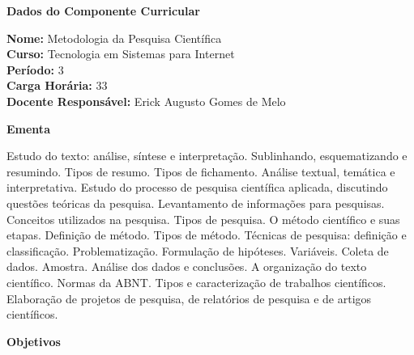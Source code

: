 

\begin{snugshade}\begin{center}\textbf{
    Dados do Componente Curricular
}\end{center}\end{snugshade}

\noindent \textbf{Nome:}                Metodologia da Pesquisa Cient\'ifica
\\        \textbf{Curso:}               Tecnologia em Sistemas para Internet
\\        \textbf{Período:}             \unit{3}{\degree}
\\        \textbf{Carga Horária:}       \unit{33}{\hour}
\\        \textbf{Docente Responsável:} Erick Augusto Gomes de Melo 


\begin{snugshade}\begin{center}\textbf{
    Ementa
\vphantom{q}}\end{center}\end{snugshade}

\noindent
Estudo do texto: análise, síntese e interpretação. Sublinhando, esquematizando e resumindo. Tipos de resumo. Tipos de fichamento. Análise textual, temática e interpretativa. Estudo do processo de pesquisa científica aplicada, discutindo questões teóricas da pesquisa. Levantamento de informações para pesquisas. Conceitos utilizados na pesquisa. Tipos de pesquisa. O método científico e suas etapas. Definição de método. Tipos de método. Técnicas de pesquisa: definição e classificação. Problematização. Formulação de hipóteses. Variáveis. Coleta de dados. Amostra. Análise dos dados e conclusões. A organização do texto científico. Normas da ABNT. Tipos e caracterização de trabalhos científicos. Elaboração de projetos de pesquisa, de relatórios de pesquisa e de artigos científicos.


\begin{snugshade}\begin{center}\textbf{
    Objetivos
}\end{center}\end{snugshade}

